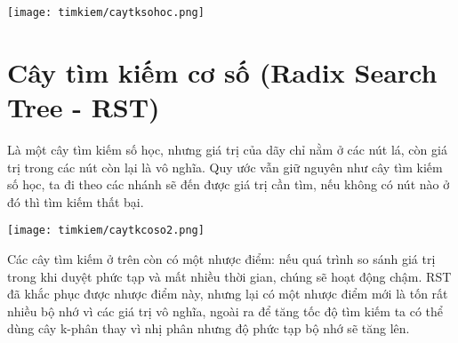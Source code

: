 \texttt{[image: timkiem/caytksohoc.png]}

\section{Cây tìm kiếm cơ số (Radix Search Tree - RST)}
Là một cây tìm kiếm số học, nhưng giá trị của dãy chỉ nằm ở các nút lá, còn giá trị trong các nút còn lại là vô nghĩa. Quy ước vẫn giữ nguyên như cây tìm kiếm số học, ta đi theo các nhánh sẽ đến được giá trị cần tìm, nếu không có nút nào ở đó thì tìm kiếm thất bại.

\texttt{[image: timkiem/caytkcoso2.png]}

Các cây tìm kiếm ở trên còn có một nhược điểm: nếu quá trình so sánh giá trị trong khi duyệt phức tạp và mất nhiều thời gian, chúng sẽ hoạt động chậm. RST đã khắc phục được nhược điểm này, nhưng lại có một nhược điểm mới là tốn rất nhiều bộ nhớ vì các giá trị vô nghĩa, ngoài ra để tăng tốc độ tìm kiếm ta có thể dùng cây k-phân thay vì nhị phân nhưng độ phức tạp bộ nhớ sẽ tăng lên.